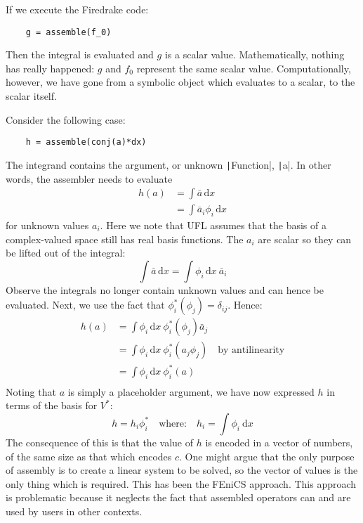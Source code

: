\documentclass[a4paper,11pt]{article}
\begin{document}
If we execute the Firedrake code:
\begin{verbatim}
    g = assemble(f_0)
\end{verbatim}
Then the integral is evaluated and $g$ is a scalar value. Mathematically, nothing has really happened: $g$ and $f_0$ represent the same scalar value. Computationally, however, we have gone from a symbolic object which evaluates to a scalar, to the scalar itself.

Consider the following case:
\begin{verbatim}
    h = assemble(conj(a)*dx)
\end{verbatim}
The integrand contains the argument, or unknown \texttt|Function|, \texttt|a|. In other words, the assembler needs to evaluate
\begin{equation}
    \begin{split}
        h(a) &= \int \bar{a}\,\mathrm{d}x\\
        &= \int \bar{a}_i \phi_i\,\mathrm{d}x
    \end{split}
\end{equation}
for unknown values $a_i$. Here we note that UFL assumes that the basis of a complex-valued space still has real basis functions. The $a_i$ are scalar so they can be lifted out of the integral:
\begin{equation}
    \int \bar{a}\,\mathrm{d}x = \int \phi_i\,\mathrm{d}x\ \bar{a}_i
\end{equation}
Observe the integrals no longer contain unknown values and can hence be evaluated. 
Next, we use the fact that $\phi^*_i(\phi_j) = \delta_{ij}$. Hence:
\begin{equation}
    \begin{split}
        h(a) &= \int \phi_i\,\mathrm{d}x\ \phi^*_i(\phi_j) \bar{a}_j\\
        &= \int \phi_i\,\mathrm{d}x\ \phi^*_i(a_j\phi_j)\quad\textrm{by antilinearity}\\
        &= \int \phi_i\,\mathrm{d}x\ \phi^*_i(a)\\
    \end{split}
\end{equation}
Noting that $a$ is simply a placeholder argument, we have now expressed $h$ in terms of the basis for $V^*$: 
\begin{equation}
    h = h_i \phi^*_i\quad \textrm{where:} \quad h_i = \int \phi_i\ \mathrm{d}x \label{eq:cofunction}
\end{equation}
The consequence of this is that the value of $h$ is encoded in a vector of numbers, of the same size as that which encodes $c$. One might argue that the only purpose of assembly is to create a linear system to be solved, so the vector of values is the only thing which is required. This has been the FEniCS approach. This approach is problematic because it neglects the fact that assembled operators can and are used by users in other contexts. 
\end{document}
